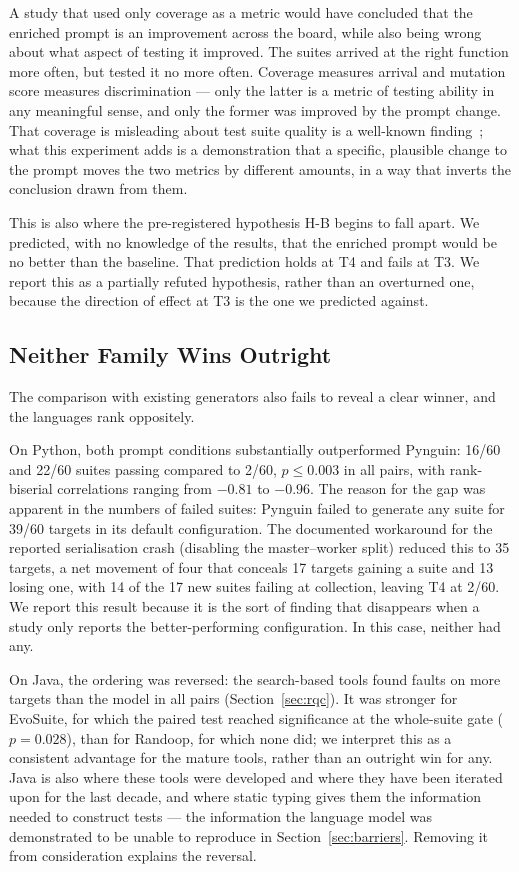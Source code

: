 A study that used only coverage as a metric would have concluded that the enriched prompt is an
improvement across the board, while also being wrong about what aspect of testing it improved.
The suites arrived at the right function more often, but tested it no more often. Coverage
measures arrival and mutation score measures discrimination --- only the latter is a metric of
testing ability in any meaningful sense, and only the former was improved by the prompt change.
That coverage is misleading about test suite quality is a well-known
finding~\cite{inozemtseva2014coverage}; what this experiment adds is a demonstration that a
specific, plausible change to the prompt moves the two metrics by different amounts, in a way
that inverts the conclusion drawn from them.

This is also where the pre-registered hypothesis H-B begins to fall apart. We predicted, with
no knowledge of the results, that the enriched prompt would be no better than the baseline.
That prediction holds at T4 and fails at T3. We report this as a partially refuted hypothesis,
rather than an overturned one, because the direction of effect at T3 is the one we predicted
against.

\subsection{Neither Family Wins Outright}

The comparison with existing generators also fails to reveal a clear winner, and the languages
rank oppositely.

On Python, both prompt conditions substantially outperformed Pynguin: 16/60 and 22/60 suites
passing compared to 2/60, $p \le 0.003$ in all pairs, with rank-biserial correlations ranging
from $-0.81$ to $-0.96$. The reason for the gap was apparent in the numbers of failed suites:
Pynguin failed to generate any suite for 39/60 targets in its default configuration. The
documented workaround for the reported serialisation crash (disabling the master--worker split)
reduced this to 35 targets, a net movement of four that conceals 17 targets gaining a suite and
13 losing one, with 14 of the 17 new suites failing at collection, leaving T4 at 2/60. We
report this result because it is the sort of finding that disappears when a study only reports
the better-performing configuration. In this case, neither had any.

On Java, the ordering was reversed: the search-based tools found faults on more targets than
the model in all pairs (Section~\ref{sec:rqc}). It was stronger for EvoSuite, for which the
paired test reached significance at the whole-suite gate ($p=0.028$), than for Randoop, for
which none did; we interpret this as a consistent advantage for the mature tools, rather than
an outright win for any. Java is also where these tools were developed and where they have been
iterated upon for the last decade, and where static typing gives them the information needed to
construct tests --- the information the language model was demonstrated to be unable to
reproduce in Section~\ref{sec:barriers}. Removing it from consideration explains the reversal.


